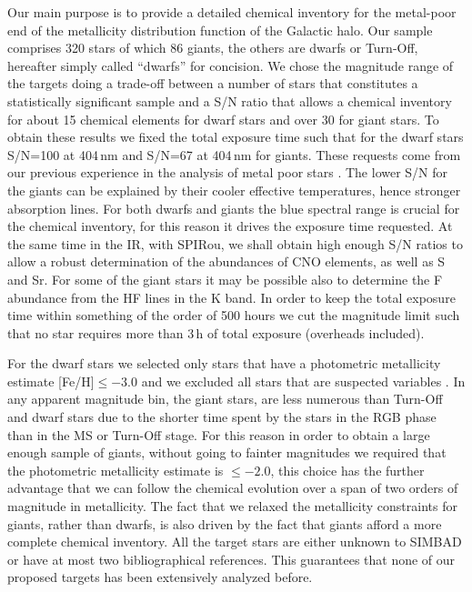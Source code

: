 \documentclass[
    traditabstract,
    longauth,
    onecolumn,
]{aa}
\def \spi{SPIRou}
\begin{document}
Our main purpose is to provide a detailed chemical inventory for the metal-poor end of the metallicity distribution function of the Galactic halo. Our sample comprises 320 stars of which 86 giants, the others are dwarfs or Turn-Off, hereafter simply called ``dwarfs'' for concision. 
We chose the
magnitude range of the targets doing a trade-off between a number of stars that
constitutes a statistically significant sample and a S/N ratio that allows a
chemical inventory for about 15 chemical elements for dwarf stars and over 30 for giant stars. 
To obtain these results we fixed the total exposure time such that for the dwarf stars S/N=100 at 404\,nm and S/N=67 at 404\,nm  for giants. These requests come from our previous experience in the analysis of metal poor stars \citep[see e.g.][]{bonifacio_topos_2018,francois_detailed_2020}. The lower S/N for the giants can be explained by their cooler effective temperatures, hence stronger absorption lines. For both dwarfs and giants the blue spectral range is crucial for the chemical inventory, for this reason it drives the exposure time requested. At the same time in the IR, with \spi, we shall obtain high enough S/N ratios to allow a robust determination of the abundances of CNO elements, as well as S and Sr. For some of the giant stars it may be possible also to determine the F abundance from the HF lines in the K band. In order to keep the total exposure time within something of the order of 500 hours we cut the magnitude limit such that no star requires more than 3\,h of total exposure (overheads included). 

For the dwarf stars we selected only stars that have a photometric metallicity estimate [Fe/H]$\le -3.0$ and we excluded all stars that are suspected variables \cite[see][]{martin_pristine_2024}. In any apparent magnitude bin, the giant stars, are less   numerous than Turn-Off and dwarf stars due to the shorter 
time spent by the stars in the RGB phase than in the MS or Turn-Off stage. 
For this reason in order to obtain a large enough sample of giants, without
going to fainter magnitudes we required that the photometric metallicity estimate is $\le -2.0$, this choice has the further advantage that we can
follow the chemical evolution over a span of two orders of magnitude in metallicity. The fact that we relaxed the metallicity constraints for giants, rather than dwarfs, is also driven by the fact that giants afford a more complete chemical inventory. All the target stars are either unknown to SIMBAD or have at most two bibliographical references. This guarantees that none of our proposed targets has been extensively analyzed before.
\end{document}
